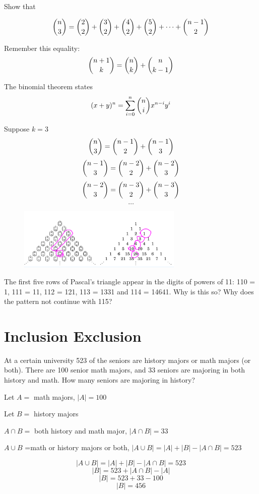 \documentclass[openany, 11pt]{book}
\begin{document}
\begin{exercise}{}{}
	Show that
	\begin{alist}
		\item
		$$
			\dbinom{n}{3}=
			\dbinom{2}{2} +
			\dbinom{3}{2} +
			\dbinom{4}{2} +
			\dbinom{5}{2} +
			\dots +
			\dbinom{n-1}{2}
		$$

		\item Remember this equality:
		$$\dbinom{n+1}{k} = \dbinom{n}{k} + \dbinom{n}{k-1}$$

		\item The binomial theorem states
		$$(x+y)^n=\sum\limits_{i=0}^n\dbinom{n}{i}x^{n-i}y^i$$
		\item

		\item Suppose $k=3$
		$$
			\dbinom{n}{3}=
			\dbinom{n-1}{2} +
			\dbinom{n-1}{3}
		$$
		$$
			\dbinom{n-1}{3} =
			\dbinom{n-2}{2} +
			\dbinom{n-2}{3}
		$$
		$$
			\dbinom{n-2}{3} =
			\dbinom{n-3}{2} +
			\dbinom{n-3}{3}
		$$
		$$
			\dots
		$$
	\end{alist}
\end{exercise}
\begin{figure}
	\centering
	\includegraphics[width=0.7\textwidth]{images/pascals-triangle.png}
\end{figure}
\begin{exercise}{}{}
	The first five rows of Pascal's triangle appear in the digits of powers of 11: 110 = 1,
	111 = 11, 112 = 121, 113 = 1331 and 114 = 14641. Why is this so? Why does the
	pattern not continue with 115?
\end{exercise}

\section{Inclusion Exclusion}

\begin{exercise}{}
	At a certain university 523 of the seniors are history
	majors or math majors (or both). There are 100 senior math majors, and 33
	seniors are majoring in both history and math. How many seniors are majoring in
	history?
	\begin{alist}
		\item Let $A=$ math majors, $|A|=100$
		\item Let $B=$ history majors
		\item $A\cap B=$ both history and math major, $|A\cap B|=33$
		\item $A \cup B$ =math or history majors or both, $|A\cup B|=|A| +
			|B| - |A\cap B|=523$
		\item
		$$|A\cup B|=|A| + |B| - |A\cap B|=523$$
		$$|B| = 523 + |A\cap B| - |A|$$
		$$|B| = 523 + 33 - 100$$
		$$|B| = 456$$
	\end{alist}
\end{exercise}
\end{document}
